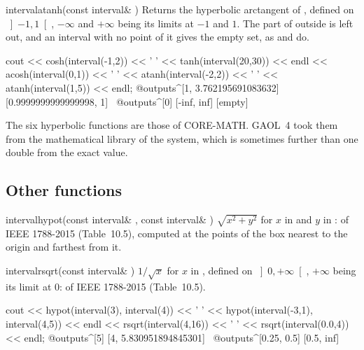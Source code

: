 \begin{deffun}{interval}{atanh}{(const interval\& )}
  Returns the hyperbolic arctangent of , defined on
  $\left]-1,1\right[$, $-\infty$ and $+\infty$ being its limits at $-1$ and
  $1$. The part of  outside is left out, and an interval with no point
  of it gives the empty set, as  and
   do.
\begin{example}
cout << cosh(interval(-1,2)) << ' '
     << tanh(interval(20,30)) << endl
     << acosh(interval(0,1)) << ' '
     << atanh(interval(-2,2)) << ' '
     << atanh(interval(1,5)) << endl;
@outputs^[1, 3.762195691083632] [0.9999999999999998, 1]~
@outputs^[0] [-inf, inf] [empty]~
\end{example}
\end{deffun}

\begin{Rem}\label{rem:arithmetic-hyperbolic-coremath}
The six hyperbolic functions are those of CORE-MATH. GAOL~4 took them from
the mathematical library of the system, which is sometimes further than one
double from the exact value.\newinvfive
\end{Rem}

\subsection{Other functions}\label{sec:arithmetic-other}

\begin{deffun}{interval}{hypot}{(const interval\& , const interval\& )}
  $\sqrt{x^2+y^2}$ for $x$ in  and $y$ in :  of
  IEEE 1788-2015 (Table~10.5), computed at the points of the box nearest to
  the origin and farthest from it.\newinvfive
\end{deffun}

\begin{deffun}{interval}{rsqrt}{(const interval\& )}
  $1/\sqrt{x}$ for $x$ in , defined on $\left]0,+\infty\right[$,
  $+\infty$ being its limit at 0:  of IEEE 1788-2015
  (Table~10.5).\newinvfive
\begin{example}
cout << hypot(interval(3), interval(4)) << ' '
     << hypot(interval(-3,1), interval(4,5)) << endl
     << rsqrt(interval(4,16)) << ' '
     << rsqrt(interval(0.0,4)) << endl;
@outputs^[5] [4, 5.830951894845301]~
@outputs^[0.25, 0.5] [0.5, inf]~
\end{example}
\end{deffun}

